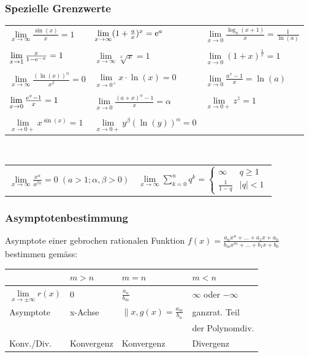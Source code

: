 		\subsubsection{Spezielle Grenzwerte}	
			\begin{tabular}{lll}
				$\lim\limits_{x \to \infty} \frac{\sin(x)}{x} = 1$ &  $\lim\limits_{x \to \infty} (1 + \frac{a}{x})^x = \mathrm{e}^a$ & $\lim\limits_{x \to 0} \frac{\log_a(x+1)}{x} = \frac{1}{\ln(a)}$  \\
				\\
				$\lim\limits_{x \to 1} \frac{x}{1-\mathrm{e}^{-x}} = 1$ & $\lim\limits_{x \to \infty} \sqrt[x]{x} = 1$  & $\lim\limits_{x \to 0} (1+x)^{\frac{1}{x}} = 1$ \\
				\\
				$\lim\limits_{x \to \infty} \frac{(\ln(x))^\alpha}{x^\beta} = 0$ & $\lim\limits_{x \to 0^+} x \cdot \ln(x) = 0$  & $\lim\limits_{x \to 0} \frac{a^x -1}{x} = \ln(a)$ \\
				\\
				$\lim\limits_{x \to 0} \frac{\mathrm{e}^x - 1}{x} = 1$ & $\lim\limits_{x \to 0} \frac{(a+x)^\alpha -1}{x} = \alpha$  & $\lim\limits_{x \to 0+} z^z = 1$ \\
				\\
				$\lim\limits_{x \to 0+} x^{\sin(x)} = 1$ & $\lim\limits_{x \to 0+} y^{\beta} (\ln(y))^{\alpha} = 0 $ &  \\
			\end{tabular}
			\\
			\begin{tabular}{ll}
				$\lim\limits_{x \to \infty} \frac{x^\alpha}{a^{\beta x}} = 0 \; (a > 1; \alpha, \beta > 0)$  & $\lim\limits_{x \to \infty} \sum\limits _{k=0}^n q^k = 
					\begin{cases}			
						\infty & q \geq 1 \\
						\frac{1}{1-q} & \vert q \vert < 1
					\end{cases} $ \\ 
			\end{tabular}

		\subsubsection{Asymptotenbestimmung}
			Asymptote einer gebrochen rationalen Funktion $f(x) = \frac{a_nx^n + ... + a_1x + a_0}{b_mx^m + ... + b_1x + b_0}$\\
			bestimmen gemäss:
			
			\begin{tabular}{|l|l|l|l|}
				\hline
				& $m > n$ & $m = n$ & $m < n$ \\
				\hline
				$\lim\limits_{x\to \pm \infty} r(x)$  & 0 & $\frac{a_n}{b_m}$ & $\infty$ oder $-\infty$ \\
				\hline
				Asymptote & x-Achse & $\parallel x, g(x) = \frac{a_m}{b_n}$ & ganzrat. Teil \\
				          &         &                                        & der Polynomdiv. \\
				\hline
				Konv./Div. & Konvergenz & Konvergenz & Divergenz \\
				\hline
			\end{tabular}
			
